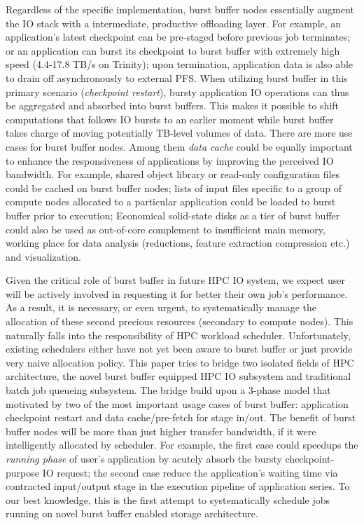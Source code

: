 Regardless of the specific implementation, burst buffer nodes essentially augment
the IO stack with a intermediate, productive offloading layer.
For example, an application's latest checkpoint can be pre-staged
before previous job terminates;
or an application can burst its checkpoint to burst buffer
with extremely high speed (4.4-17.8 TB/s on Trinity);
upon termination, application data is also able to drain off
asynchronously to external PFS.
When utilizing burst buffer in this primary scenario (\textit{checkpoint restart}),
bursty application IO operations can thus be aggregated and absorbed into burst buffers.
This makes it possible to shift computations that follows IO bursts to an earlier moment
while burst buffer takes charge of moving potentially TB-level volumes of data.
There are more use cases for burst buffer nodes.
Among them \textit{data cache} could be equally important to enhance the responsiveness
of applications by improving the perceived IO bandwidth\cite{BBUseCase}.
For example, shared object library or read-only configuration files could be
cached on burst buffer nodes;
lists of input files specific to a group of compute nodes allocated to
a particular application could be loaded to burst buffer prior to execution;
Economical solid-state disks as a tier of burst buffer could also be used as
out-of-core complement to insufficient main memory\cite{Romanus:CORR:15},
working place for data analysis (reductions, feature extraction compression etc.)
and visualization\cite{BBUseCase}.

Given the critical role of burst buffer in future HPC IO system,
we expect user will be actively involved in requesting it for
better their own job's performance.
As a result, it is necessary, or even urgent, to systematically manage
the allocation of these second precious resources (secondary to compute nodes).
This naturally falls into the responsibility of HPC workload scheduler.
Unfortunately, existing schedulers
either have not yet been aware to burst buffer\cite{Moab} %
or just provide very naive allocation policy\cite{SlurmBBGuide}.
This paper tries to bridge two isolated fields of HPC architecture,
the novel burst buffer equipped HPC IO subsystem and
traditional batch job queueing subsystem.
The bridge build upon a 3-phase model that motivated by two of the most
important usage cases of burst buffer:
application checkpoint restart and data cache/pre-fetch for stage in/out.
The benefit of burst buffer nodes will be more than just higher transfer
bandwidth, if it were intelligently allocated by scheduler.
For example, the first case could speedups the \textit{running phase} of
user's application by acutely absorb the bursty checkpoint-purpose IO request;
the second case reduce the application's waiting time via
contracted input/output stage in the execution pipeline of application series.
To our best knowledge, this is the first attempt to systematically schedule jobs running on novel burst buffer enabled storage architecture.


